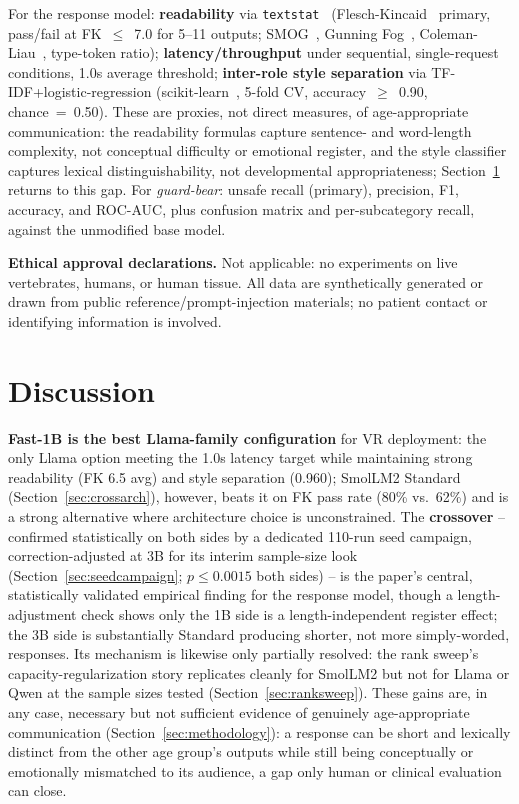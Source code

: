 \documentclass[pdflatex,sn-mathphys-num]{sn-jnl}%
\begin{document}
For the response model: \textbf{readability} via \texttt{textstat}~\cite{bansal2023textstat} (Flesch-Kincaid~\cite{kincaid1975fk} primary, pass/fail at FK~$\leq$~7.0 for 5--11 outputs; SMOG~\cite{mclaughlin1969smog}, Gunning Fog~\cite{gunning1952fog}, Coleman-Liau~\cite{coleman1975cli}, type-token ratio); \textbf{latency/throughput} under sequential, single-request conditions, 1.0s average threshold; \textbf{inter-role style separation} via TF-IDF+logistic-regression (scikit-learn~\cite{pedregosa2011sklearn}, 5-fold CV, accuracy~$\geq$~0.90, chance~=~0.50). These are proxies, not direct measures, of age-appropriate communication: the readability formulas capture sentence- and word-length complexity, not conceptual difficulty or emotional register, and the style classifier captures lexical distinguishability, not developmental appropriateness; Section~\ref{sec:discussion} returns to this gap. For \textit{guard-bear}: unsafe recall (primary), precision, F1, accuracy, and ROC-AUC, plus confusion matrix and per-subcategory recall, against the unmodified base model.

\textbf{Ethical approval declarations.} Not applicable: no experiments on live vertebrates, humans, or human tissue. All data are synthetically generated or drawn from public reference/prompt-injection materials; no patient contact or identifying information is involved.

\section{Discussion}\label{sec:discussion}

\textbf{Fast-1B is the best Llama-family configuration} for VR deployment: the only Llama option meeting the 1.0s latency target while maintaining strong readability (FK 6.5 avg) and style separation (0.960); SmolLM2 Standard (Section~\ref{sec:crossarch}), however, beats it on FK pass rate (80\% vs.\ 62\%) and is a strong alternative where architecture choice is unconstrained. The \textbf{crossover} -- confirmed statistically on both sides by a dedicated 110-run seed campaign, correction-adjusted at 3B for its interim sample-size look (Section~\ref{sec:seedcampaign}; $p\leq0.0015$ both sides) -- is the paper's central, statistically validated empirical finding for the response model, though a length-adjustment check shows only the 1B side is a length-independent register effect; the 3B side is substantially Standard producing shorter, not more simply-worded, responses. Its mechanism is likewise only partially resolved: the rank sweep's capacity-regularization story replicates cleanly for SmolLM2 but not for Llama or Qwen at the sample sizes tested (Section~\ref{sec:ranksweep}). These gains are, in any case, necessary but not sufficient evidence of genuinely age-appropriate communication (Section~\ref{sec:methodology}): a response can be short and lexically distinct from the other age group's outputs while still being conceptually or emotionally mismatched to its audience, a gap only human or clinical evaluation can close.
\end{document}
